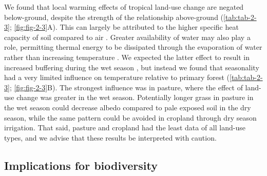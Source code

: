 \documentclass[12pt,a4paper,]{report}
\theoremstyle{definition}
\theoremstyle{definition}
\theoremstyle{definition}
\theoremstyle{remark}
\begin{document}
We found that local warming effects of tropical land-use change are
negated below-ground, despite the strength of the relationship
above-ground (\autoref{tab:tab-2-3}; \autoref{fig:fig-2-3}A). This can
largely be attributed to the higher specific heat capacity of soil
compared to air \citep{oke_boundary1987}. Greater availability of water
may also play a role, permitting thermal energy to be dissipated through
the evaporation of water rather than increasing temperature
\citep{oke_boundary1987, davin_climatic2010, christidis_role2013}. We
expected the latter effect to result in increased buffering during the
wet season \citep[cf.][]{findell_modeled2007, davin_climatic2010}, but
instead we found that seasonality had a very limited influence on
temperature relative to primary forest (\autoref{tab:tab-2-3};
\autoref{fig:fig-2-3}B). The strongest influence was in pasture, where
the effect of land-use change was greater in the wet season. Potentially
longer grass in pasture in the wet season could decrease albedo compared
to pale exposed soil in the dry season, while the same pattern could be
avoided in cropland through dry season irrigation. That said, pasture
and cropland had the least data of all land-use types, and we advise
that these results be interpreted with caution.

\subsection{Implications for
biodiversity}\label{implications-for-biodiversity}
\end{document}
